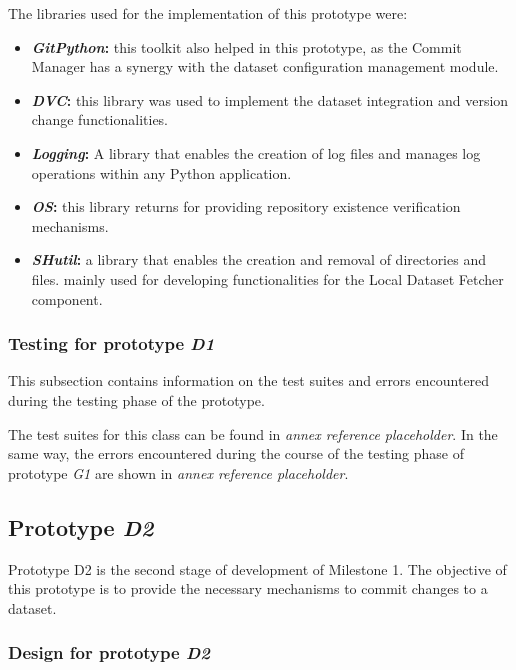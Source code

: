 The libraries used for the implementation of this prototype were:

\begin{itemize}
    \item \textbf{\emph{GitPython}: }this toolkit also helped in this prototype, as the Commit Manager has a synergy with the dataset configuration management module.
    \item \textbf{\emph{DVC}: }this library was used to implement the dataset integration and version change functionalities.
    \item \textbf{\emph{Logging}: }A library that enables the creation of log files and manages log operations within any Python application.
    \item \textbf{\emph{OS}: }this library returns for providing repository existence verification mechanisms.
    \item \textbf{\emph{SHutil}: }a library that enables the creation and removal of directories and files. mainly used for developing functionalities for the Local Dataset Fetcher component.
\end{itemize}

\subsubsection{Testing for prototype \emph{D1}}

This subsection contains information on the test suites and errors encountered during the testing phase of the prototype.

The test suites for this class can be found in \emph{annex reference placeholder}. %
In the same way, the errors encountered during the course of the testing phase of prototype \emph{G1} are shown in \emph{annex reference placeholder}. %

\subsection{Prototype \emph{D2}}

Prototype D2 is the second stage of development of Milestone 1. The objective of this prototype is to provide the necessary mechanisms to commit changes to a dataset.

\subsubsection{Design for prototype \emph{D2}}

